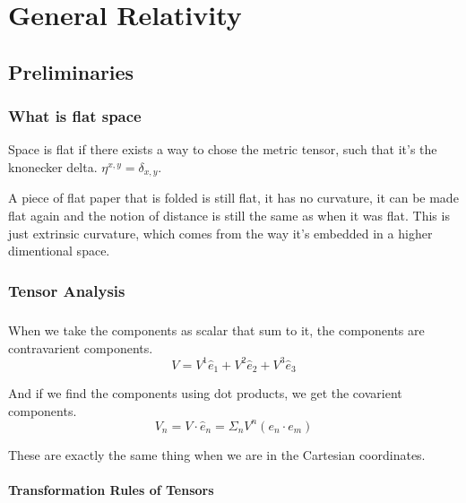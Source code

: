 \chapter{General Relativity}



\section{Preliminaries}


\subsection{What is flat space}

Space is flat if there exists a way to chose the metric tensor, such that it's the knonecker delta. $\eta^{x,y} = \delta_{x,y}$.

\begin{small}
  A piece of flat paper that is folded is still flat, it has no curvature, it can be made flat again and the notion of distance is still the same as when it was flat. This is just extrinsic curvature, which comes from the way it's embedded in a higher dimentional space.
\end{small}


\subsection{Tensor Analysis}

\paragraph{} When we take the components as scalar that sum to it, the components are contravarient components.
\begin{equation}
  V = V^1 \hat{e}_1 + V^2 \hat{e}_2 + V^3 \hat{e}_3
\end{equation}

And if we find the components using dot products, we get the covarient components.
\begin{equation}
  V_n = V \cdot \hat{e}_n = \Sigma_n V^n (e_n \cdot e_m)
\end{equation}

These are exactly the same thing when we are in the Cartesian coordinates.

\subsubsection{Transformation Rules of Tensors}

